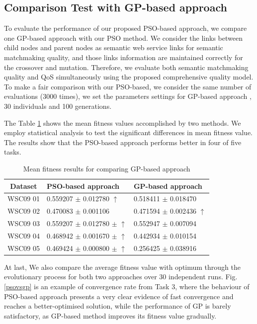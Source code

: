 \documentclass{IEEEtran}
\begin{document}
\subsection{Comparison Test with GP-based approach}\label{comparisonTestWithGP}
To evaluate the performance of our proposed PSO-based approach, we compare one GP-based approach  \cite{ma2015hybrid} with our PSO method. We consider the links between child nodes and parent nodes as semantic web service links for semantic matchmaking quality, and those links information are maintained correctly for the crossover and mutation. Therefore, we evaluate both semantic matchmaking quality and QoS simultaneously using the proposed comprehensive quality model. To make a fair comparison with our PSO-based, we consider the same number of evaluations (3000 times), we set the parameters settings for GP-based approach \cite{ma2015hybrid}, 30 individuals and 100 generations.

The Table \ref{meanFitness} shows the mean fitness values accomplished by two methods. We employ statistical analysis to test the significant differences in mean fitness value.  The results show that the PSO-based approach performs better in four of five tasks.

\begin{table}[]
\centering
\caption{Mean fitness results for comparing GP-based approach}
\label{meanFitness}
\begin{tabular}{l|l|l}
\hline
\multicolumn{1}{c|}{Dataset} & PSO-based approach & GP-based approach  \\ \hline
WSC09 01                     &0.559207 $\pm$ 0.012780 $\uparrow$      &0.518411 $\pm$ 0.018470               \\ \hline
WSC09 02                     &0.470083 $\pm$  0.001106   &0.471594 $\pm$  0.002436 $\uparrow$           \\ \hline
WSC09 03                     & 0.559207 $\pm$ 0.012780 $\pm$ $\uparrow$  &0.552947 $\pm$ 0.007094            \\ \hline
WSC09 04                     & 0.468942 $\pm$ 0.001670 $\pm$ $\uparrow$  &0.442934 $\pm$ 0.010154            \\ \hline
WSC09 05                     & 0.469424 $\pm$ 0.000800 $\pm$ $\uparrow$  &0.256425 $\pm$ 0.038916            \\ \hline
\end{tabular}
\end{table}

At last, We also compare the average fitness value with optimum through the evolutionary process for both two approaches over 30 independent runs. Fig. \ref{psovsgp} is an example of convergence rate from Task 3, where the behaviour of PSO-based approach presents a very clear evidence of fast convergence and reaches a better-optimised solution, while the performance of GP is barely satisfactory, as GP-based method improves its fitness value gradually.
\end{document}
